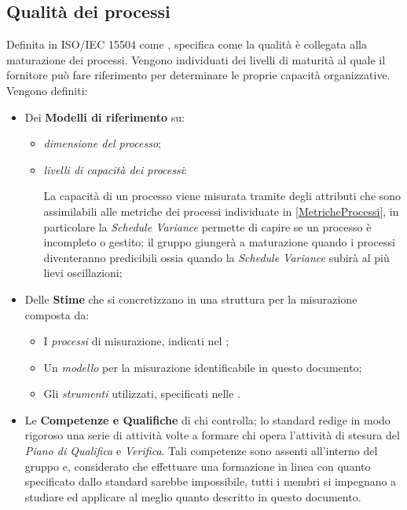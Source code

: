 	\subsection{Qualità dei processi}
	Definita in ISO/IEC 15504 come , specifica come la qualità è collegata alla maturazione dei processi. Vengono individuati dei livelli di maturità al quale il fornitore può fare riferimento per determinare le proprie capacità organizzative. Vengono definiti:
	\begin{itemize}
		\item Dei \textbf{Modelli di riferimento} su:
			\begin{itemize}
				\item \emph{dimensione del processo};
				\item \emph{livelli di capacità dei processi}:
					La capacità di un processo viene misurata tramite degli attributi che sono assimilabili alle metriche dei processi individuate in \ref{MetricheProcessi}, in particolare la \emph{Schedule Variance} permette di capire se un processo è incompleto o gestito; il gruppo giungerà a maturazione quando i processi diventeranno predicibili ossia quando la \emph{Schedule Variance} subirà al più lievi oscillazioni;
			\end{itemize}
		\item Delle \textbf{Stime} che si concretizzano in una struttura per la misurazione composta da:
			\begin{itemize}
				\item I \emph{processi} di misurazione, indicati nel \PianoDiProgetto ;
				\item Un \emph{modello} per la misurazione identificabile in questo documento;
				\item Gli \emph{strumenti} utilizzati, specificati nelle \NormeDiProgetto .
			\end{itemize}
		\item Le \textbf{Competenze e Qualifiche} di chi controlla; lo standard redige in modo rigoroso una serie di attività volte a formare chi opera l'attività di stesura del \emph{Piano di Qualifica} e \emph{Verifica}. Tali competenze sono assenti all'interno del gruppo e, considerato che effettuare una formazione in linea con quanto specificato dallo standard sarebbe impossibile, tutti i membri si impegnano a studiare ed applicare al meglio quanto descritto in questo documento.
	\end{itemize}
	
